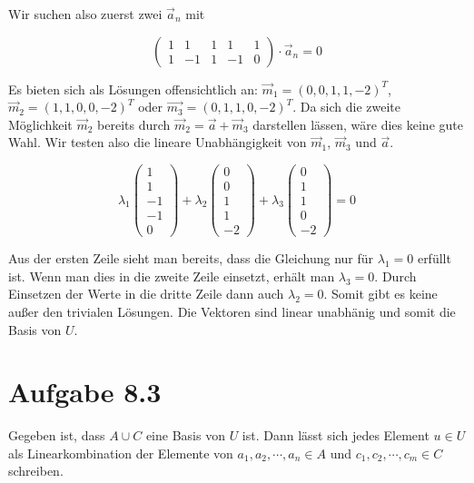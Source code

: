 \documentclass[a4paper,german,12pt,smallheadings]{scrartcl}
\begin{document}
Wir suchen also zuerst zwei $\vec{a}_n$ mit

\begin{equation*}
  \begin{pmatrix} 1 & 1 & 1 & 1 & 1 \\ 1 & -1 & 1 & -1 & 0 \end{pmatrix} \cdot \vec{a}_n = 0
\end{equation*}

Es bieten sich als Lösungen offensichtlich an: $\vec{m}_1 = (0, 0, 1, 1, -2)^T$, $\vec{m}_2 = (1, 1, 0, 0, -2)^T$
oder $\vec{m_3} = (0, 1, 1, 0, -2)^T$. Da sich die zweite Möglichkeit
$\vec{m}_2$ bereits durch $\vec{m}_2 = \vec{a} + \vec{m}_3$ darstellen lässen,
wäre dies keine gute Wahl. Wir testen also die lineare Unabhängigkeit von
$\vec{m}_1$, $\vec{m}_3$ und $\vec{a}$.

\begin{equation*}
  \lambda_1 \begin{pmatrix} 1 \\ 1 \\ -1 \\ -1 \\ 0\end{pmatrix} +
  \lambda_2 \begin{pmatrix} 0 \\ 0 \\ 1 \\ 1 \\ -2\end{pmatrix} +
  \lambda_3 \begin{pmatrix} 0 \\ 1 \\ 1 \\ 0 \\ -2 \end{pmatrix} = 0
\end{equation*}

Aus der ersten Zeile sieht man bereits, dass die Gleichung nur für $\lambda_1 =
0$ erfüllt ist. Wenn man dies in die zweite Zeile einsetzt, erhält man
$\lambda_3 = 0$. Durch Einsetzen der Werte in die dritte Zeile dann auch
$\lambda_2 = 0$. Somit gibt es keine außer den trivialen Lösungen. Die Vektoren
sind linear unabhänig und somit die Basis von $U$.

\section*{Aufgabe 8.3}

Gegeben ist, dass $A \cup C$ eine Basis von $U$ ist. Dann lässt sich jedes
Element $u \in U$ als Linearkombination der Elemente von $a_1, a_2, \dotsb, a_n
\in A$ und $c_1, c_2, \dotsb, c_m \in C$ schreiben.
\end{document}
